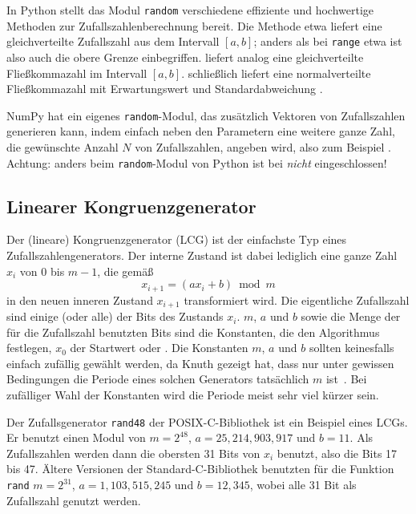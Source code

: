 In Python stellt das Modul \texttt{random} verschiedene effiziente und
hochwertige Methoden zur Zufallszahlenberechnung bereit. Die Methode
 etwa liefert eine gleichverteilte
Zufallszahl aus dem Intervall $[a,b]$; anders als bei \lstinline!range!
etwa ist also auch die obere Grenze
einbegriffen.  liefert analog eine
gleichverteilte Fließkommazahl im Intervall
$[a,b]$.  schließlich liefert eine
normalverteilte Fließkommazahl mit Erwartungswert  und
Standardabweichung .

NumPy hat ein eigenes \texttt{random}-Modul, das zusätzlich Vektoren
von Zufallszahlen generieren kann, indem einfach neben den Parametern
eine weitere ganze Zahl, die gewünschte Anzahl $N$ von Zufallszahlen,
angeben wird, also zum Beispiel . Achtung: anders beim \texttt{random}-Modul von Python ist bei
  \emph{nicht}
eingeschlossen!

\subsection{Linearer Kongruenzgenerator}

Der (lineare) Kongruenzgenerator (LCG) ist der einfachste Typ eines
Zufallszahlengenerators. Der interne Zustand ist dabei lediglich eine
ganze Zahl $x_i$ von $0$ bis $m-1$, die gemäß
\begin{equation}
  x_{i+1} = (a x_i + b) \bmod m
\end{equation}
in den neuen inneren Zustand $x_{i+1}$ transformiert wird.  Die
eigentliche Zufallszahl sind einige (oder alle) der Bits des Zustands
$x_i$.  $m$, $a$ und $b$ sowie die Menge der für die Zufallszahl
benutzten Bits sind die Konstanten, die den Algorithmus festlegen,
$x_0$ der Startwert oder \emph{}.  Die Konstanten $m$,
$a$ und $b$ sollten keinesfalls einfach zufällig gewählt werden, da
Knuth gezeigt hat, dass nur unter gewissen Bedingungen die Periode
eines solchen Generators tatsächlich $m$ ist~\cite{knuth81b}.  Bei
zufälliger Wahl der Konstanten wird die Periode meist sehr viel kürzer
sein.

Der Zufallsgenerator \texttt{rand48} der POSIX-C-Bibliothek ist ein
Beispiel eines LCGs.  Er benutzt einen Modul von $m=2^{48}$,
$a=25,214,903,917$ und $b=11$.  Als Zufallszahlen werden dann die
obersten 31 Bits von $x_i$ benutzt, also die Bits 17 bis 47.  Ältere
Versionen der Standard-C-Bibliothek benutzten für die Funktion
\texttt{rand} $m=2^{31}$, $a=1,103,515,245$ und $b=12,345$, wobei alle
31 Bit als Zufallszahl genutzt werden.

